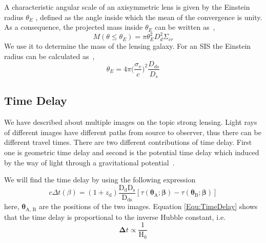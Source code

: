 \noindent
A characteristic angular scale of an axisymmetric lens is given by the Einstein radius $ \theta_{E} $ , defined as the angle inside which the mean of the convergence is unity. As a consequence, the projected mass inside $ \theta_{E} $ can be written as~\cite{manual},
\begin{equation}
M(\theta \le \theta_{E})=\pi \theta^2_{E}D^2_{d}\Sigma_{cr}
\end{equation}
\noindent
We use it to determine the mass of the lensing galaxy. For an SIS the Einstein radius can be calculated as~\cite{manual},
\begin{equation}
\theta_{E}=4\pi\bigg( \frac{\sigma_{v}}{c}\bigg)^2\frac{D_{ds}}{D_{s}}
\label{Equ:ThetaE}
\end{equation}

\subsection{Time Delay}
We have described about multiple images on the topic strong lensing. Light rays of different images have different paths from source to observer, thus there can be different travel times. There are two different contributions of time delay. First one is geometric time delay 
and second is the potential time delay which induced by the way of light through a gravitational potential~\cite{manual}.

We will find the time delay by using the following expression~\cite{manual}
\begin{equation}
c\Delta t(\beta)=(1+z_{\text{d}})\frac{\text{D}_{\text{d}}\text{D}_{\text{s}}}{\text{D}_{\text{ds}}}[\tau(\pmb\theta_{\text{A}}; \pmb\beta)-\tau(\pmb\theta_{\text{B}}; \pmb\beta)]
\label{Equ:TimeDelay}
\end{equation}
\noindent
here, $ \pmb\theta_{\text{A, B}} $ are the positions of the two images. Equation \ref{Equ:TimeDelay} shows that the time delay is proportional to the inverse Hubble constant, i.e.
\begin{equation}
\pmb\Delta t \propto \frac{1}{\text{H}_{0}}
\end{equation}


